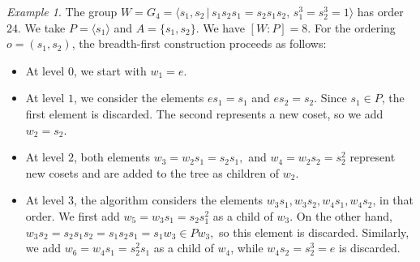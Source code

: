 \documentclass[11pt, reqno]{amsart}
\numberwithin{equation}{section}
\theoremstyle{remark}
\newtheorem{example}[theorem]{Example}
\begin{document}
		\begin{example}\label{g4bfs} The group
			$W=G_4=\langle s_1,s_2 \,|\, s_1s_2s_1=s_2s_1s_2,\, s_1^3=s_2^3=1\rangle$ has order $24$. We take $P=\langle s_1\rangle$ and $A=\{s_1,s_2\}$. We have $[W:P]=8$.
			For the ordering $o=(s_1,s_2)$, the breadth-first construction proceeds as follows:
			
			\begin{itemize}
				\item At level $0$, we start with $w_1=e$.
				
				\item At level $1$, we consider the elements $es_1=s_1$ and $es_2=s_2$. Since $s_1\in P$, the first element is discarded. The second represents a new coset, so we add
				$
				w_2=s_2.
				$
				
				\item At level $2$, both elements
				$
				w_3=w_2s_1=s_2s_1,$ and
				$w_4=w_2s_2=s_2^2
				$
				represent new cosets and are added to the tree as children of $w_2$.
				
				\item At level $3$, the algorithm considers the elements $w_3s_1,w_3s_2, w_4s_1,w_4s_2$, in that order. We first add
				$
				w_5=w_3s_1=s_2s_1^2
				$ as a child of $w_3$.
				On the other hand,
				$
				w_3s_2=s_2s_1s_2=s_1s_2s_1=s_1w_3\in Pw_3,$
				so this element is discarded.
				Similarly, we add
				$
				w_6=w_4s_1=s_2^2s_1
				$ as a child of $w_4$,
				while
				$
				w_4s_2=s_2^3=e
				$
				is discarded.
				

\end{itemize}
\end{example}
\end{document}
